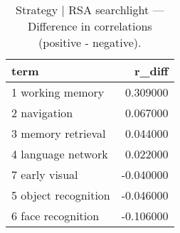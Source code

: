\begin{table}
\caption{Strategy | RSA searchlight — Difference in correlations (positive - negative).}
\label{tab:Strategy | RSA searchlight_diff}
\begin{tabular}{lr}
\toprule
term & r\_diff \\
\midrule
1 working memory & 0.309000 \\
2 navigation & 0.067000 \\
3 memory retrieval & 0.044000 \\
4 language network & 0.022000 \\
7 early visual & -0.040000 \\
5 object recognition & -0.046000 \\
6 face recognition & -0.106000 \\
\bottomrule
\end{tabular}
\end{table}

